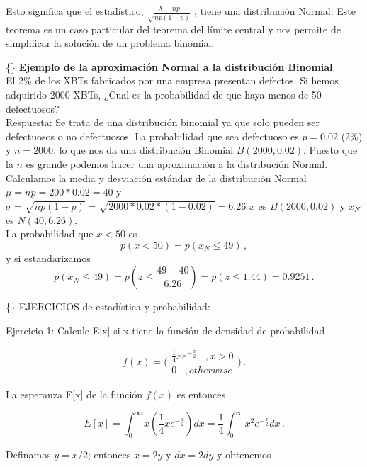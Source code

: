 \documentclass[
]{agujournal2019}
\begin{document}
Esto significa que el estadístico, \(\frac{X-np}{\sqrt{np(1-p)}}\) ,
tiene una distribución Normal. Este teorema es un caso particular del
teorema del límite central y nos permite de simplificar la solución de
un problema binomial.

\vspace{0.5cm}

\{\noindent\} \textbf{Ejemplo de la aproximación Normal a la
distribución Binomial}:\\

El 2\% de los XBTs fabricados por una empresa presentan defectos. Si
hemos adquirido 2000 XBTs, ¿Cual es la probabilidad de que haya menos de
50 defectuosos?\\

Respuesta: Se trata de una distribución binomial ya que solo pueden ser
defectuosos o no defectuosos. La probabilidad que sea defectuoso es
\(p=0.02\) (2\%) y \(n=2000\), lo que nos da una distribución Binomial
\(B(2000,0.02)\). Puesto que la \(n\) es grande podemos hacer una
aproximación a la distribución Normal. Calculamos la media y desviación
estándar de la distribución Normal \(\mu=np=200*0.02=40\) y
\(\sigma=\sqrt{np(1-p)}=\sqrt{2000*0.02*(1-0.02)}=6.26\) \(x\) es
\(B(2000,0.02)\) y \(x_N\) es \(N(40,6.26)\).\\
La probabilidad que \(x<50\) es \[p(x<50)=p(x_N\le 49)\,,\] y si
estandarizamos
\[p(x_N\le 49)=p\left(z\le \frac{49-40}{6.26} \right)=p(z\le 1.44)=0.9251\,.\]

\vspace{0.5cm}

\{\noindent\} EJERCICIOS de estadística y probabilidad:\\

\vspace{0.5cm}

Ejercicio 1: Calcule E{[}x{]} si x tiene la función de densidad de
probabilidad

\[ f(x)=\Bigg(\begin{array}{c}
 \frac{1}{4}xe^{-\frac{x}{2}}\,\,\,\,\,,x>0 \\ 0 \,\,\,\,\,,otherwise
\end{array})\,.\]

La esperanza E{[}x{]} de la función \(f(x)\) es entonces

\[E[x]=\int^\infty_0 x\left(\frac{1}{4}xe^{-\frac{x}{2}}\right)dx
      =\frac{1}{4}\int^\infty_0 x^2e^{-\frac{x}{2}}dx\,.\]

Definamos \(y=x/2\); entonces \(x=2y\) y \(dx=2dy\) y obtenemos
\end{document}
